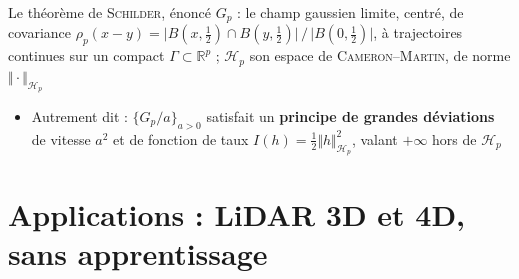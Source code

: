 \begin{frame}[t]{Le théorème de \textsc{Schilder}, énoncé}
    \small
    $G_p$ : le champ gaussien limite, centré, de covariance
    $\rho_p(x - y) = \bigl|B(x,\tfrac12) \cap B(y,\tfrac12)\bigr| \,/\, \bigl|B(0,\tfrac12)\bigr|$, à trajectoires
    continues sur un compact $\Gamma \subset \mathbb R^p$ ; \; $\mathcal H_p$ son espace de
    \textsc{Cameron}--\textsc{Martin}, de norme $\Vert\cdot\Vert_{\mathcal H_p}$

    \vspace{0.16cm}
    \begin{center}
    \end{center}

    \vspace{0.16cm}
    \begin{itemize}
        \item Autrement dit : $\{G_p / a\}_{a > 0}$ satisfait un \textbf{principe de grandes déviations}
        de vitesse $a^2$ et de fonction de taux $I(h) = \tfrac12 \Vert h\Vert^2_{\mathcal H_p}$,
        valant $+\infty$ hors de $\mathcal H_p$
    \end{itemize}
\end{frame}

\section{Applications : LiDAR 3D et 4D, sans apprentissage}
\begin{frame}[label=bk-lidar]
    \sectionpage
\end{frame}

